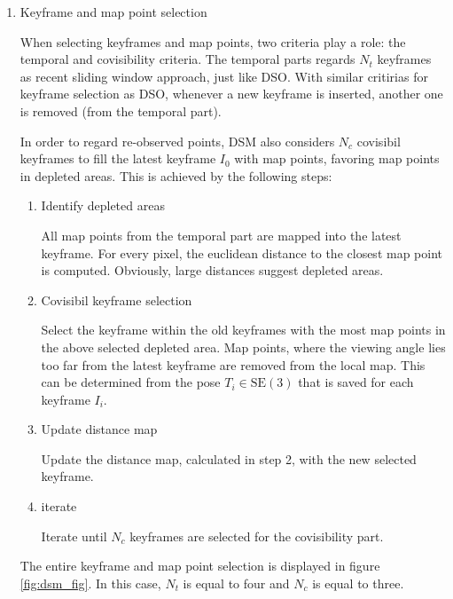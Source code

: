 	\begin{enumerate}
	\item{Keyframe and map point selection}
	
	When selecting keyframes and map points, two criteria play a role: the temporal and covisibility criteria. 
	The temporal parts regards $N_t$ keyframes as recent sliding window approach, just like DSO. With similar 
	critirias for keyframe selection as DSO, whenever a new keyframe is inserted, another one is removed (from the temporal part).

	In order to regard re-observed points, DSM also considers $N_c$ covisibil keyframes to fill the latest keyframe $I_0$ with map points, favoring 
	map points in depleted areas. This is achieved by the following steps: 
	
	\begin{enumerate}
	\item{Identify depleted areas}
	
	All map points from the temporal part are mapped into the latest keyframe. For every pixel, the euclidean distance to the closest map point 
	is computed. Obviously, large distances suggest depleted areas.
	
	\item{Covisibil keyframe selection}
	
	Select the keyframe within the old keyframes with the most map points in the above selected depleted area. Map points, where the viewing angle 
	lies too far from the latest keyframe are removed from the local map. 
	This can be determined from the pose $T_i \in \text{SE}(3)$ that is saved for each keyframe $I_i$. 
	
	\item{Update distance map}
	
	Update the distance map, calculated in step 2, with the new selected keyframe. 
	
	\item{iterate}
	
	Iterate until $N_c$ keyframes are selected for the covisibility part. 
	
	\end{enumerate}
	
	The entire keyframe and map point selection is displayed in figure \ref{fig:dsm_fig}. In this case, $N_t$ is equal to four and $N_c$ is equal to three.
	
	

\end{enumerate}
